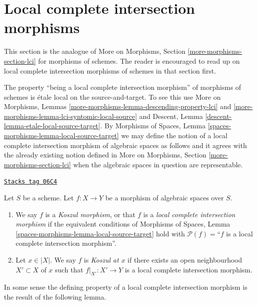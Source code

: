 \section{Local complete intersection morphisms}
\label{spaces-more-morphisms-section-lci}
This section is the analogue of
More on Morphisms, Section \ref{more-morphisms-section-lci}
for morphisms of schemes. The reader is encouraged to read up
on local complete intersection morphisms of schemes in that section first.

\medskip\noindent
The property ``being a local complete intersection morphism'' of morphisms
of schemes is \'etale local on the source-and-target. To see this use
More on Morphisms,
Lemmas \ref{more-morphisms-lemma-descending-property-lci} and
\ref{more-morphisms-lemma-lci-syntomic-local-source}
and
Descent, Lemma \ref{descent-lemma-etale-local-source-target}.
By
Morphisms of Spaces,
Lemma \ref{spaces-morphisms-lemma-local-source-target}
we may define the notion of a local complete intersection morphism
of algebraic spaces as follows and it agrees with the already existing
notion defined in
More on Morphisms, Section \ref{more-morphisms-section-lci}
when the algebraic spaces in question are representable.

\begin{definition}[Lci]
\label{spaces-more-morphisms-definition-lci}
\href{https://stacks.math.columbia.edu/tag/06C4}{\texttt{Stacks tag 06C4}}

Let $S$ be a scheme.
Let $f : X \to Y$ be a morphism of algebraic spaces over $S$.
\begin{enumerate}
\item We say $f$ is a {\it Koszul morphism}, or that $f$ is a
{\it local complete intersection morphism} if the equivalent conditions of
Morphisms of Spaces, Lemma \ref{spaces-morphisms-lemma-local-source-target}
hold with $\mathcal{P}(f) =$``$f$ is a local complete intersection morphism''.
\item Let $x \in |X|$. We say $f$ is {\it Koszul at $x$} if
there exists an open neighbourhood $X' \subset X$ of $x$ such
that $f|_{X'} : X' \to Y$ is a local complete intersection morphism.
\end{enumerate}
\end{definition}

In some sense the defining property of a local complete intersection
morphism is the result of the following lemma.

